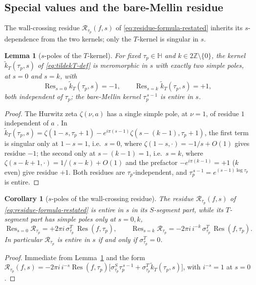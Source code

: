 \documentclass[11pt]{article}
\newtheorem{lemma}[theorem]{Lemma}
\newtheorem{corollary}[theorem]{Corollary}
\numberwithin{equation}{section}  %
\newcommand{\HH}{\mathbb{H}}
\newcommand{\ZZ}{\mathbb{Z}}
\DeclareMathOperator{\Res}{Res}
\begin{document}
\subsection{Special values and the bare-Mellin residue}\label{subsec:special-values}

The wall-crossing residue $\mathcal{R}_{\tau_p}(f, s)$ of
\eqref{eq:residue-formula-restated} inherits its $s$-dependence from the
two kernels; only the $T$-kernel is singular in $s$.

\begin{lemma}[$s$-poles of the $T$-kernel]\label{lem:kT-spoles}
For fixed $\tau_p \in \HH$ and $k \in 2\ZZ \setminus \{0\}$, the kernel
$\widetilde{k}_T(\tau_p, s)$ of \eqref{eq:tildekT-def} is meromorphic in
$s$ with exactly two simple poles, at $s = 0$ and $s = k$, with
\begin{equation}\label{eq:kT-spole-residues}
  \Res_{s=0}\widetilde{k}_T(\tau_p, s) = -1,
  \qquad
  \Res_{s=k}\widetilde{k}_T(\tau_p, s) = +1,
\end{equation}
both independent of $\tau_p$; the bare-Mellin kernel $\tau_p^{\,s-1}$ is
entire in $s$.
\end{lemma}
\begin{proof}
The Hurwitz zeta $\zeta(\nu, a)$ has a single simple pole, at $\nu = 1$,
of residue $1$ independent of $a$ \cite[\S25.11]{DLMF}.  In
$\widetilde{k}_T(\tau_p, s) = \zeta(1 - s, \tau_p + 1) - e^{i\pi(s-1)}\zeta(s - (k - 1), \tau_p + 1)$,
the first term is singular only at $1 - s = 1$, i.e.\ $s = 0$, where
$\zeta(1 - s, \cdot) = -1/s + O(1)$ gives residue $-1$; the second only
at $s - (k - 1) = 1$, i.e.\ $s = k$, where
$\zeta(s - k + 1, \cdot) = 1/(s - k) + O(1)$ and the prefactor
$-e^{i\pi(k-1)} = +1$ ($k$ even) give residue $+1$.  Both residues are
$\tau_p$-independent, and $\tau_p^{\,s-1} = e^{(s-1)\log\tau_p}$ is
entire.
\end{proof}

\begin{corollary}[$s$-poles of the wall-crossing residue]\label{cor:R-spoles}
The residue $\mathcal{R}_{\tau_p}(f, s)$ of
\eqref{eq:residue-formula-restated} is entire in $s$ in its $S$-segment
part, while its $T$-segment part has simple poles only at $s = 0, k$,
\begin{equation}\label{eq:R-spole-residues}
  \Res_{s=0}\mathcal{R}_{\tau_p} = +2\pi i\,\sigma^T_{\tau_p}\,\Res(f, \tau_p),
  \qquad
  \Res_{s=k}\mathcal{R}_{\tau_p} = -2\pi i\,i^{-k}\,\sigma^T_{\tau_p}\,\Res(f, \tau_p).
\end{equation}
In particular $\mathcal{R}_{\tau_p}$ is entire in $s$ if and only if
$\sigma^T_{\tau_p} = 0$.
\end{corollary}
\begin{proof}
Immediate from Lemma~\ref{lem:kT-spoles} and the form
$\mathcal{R}_{\tau_p}(f, s) = -2\pi i\,i^{-s}\Res(f, \tau_p)\bigl[\sigma^S_{\tau_p}\tau_p^{\,s-1} + \sigma^T_{\tau_p}\widetilde{k}_T(\tau_p, s)\bigr]$,
with $i^{-s} = 1$ at $s = 0$.
\end{proof}
\end{document}
